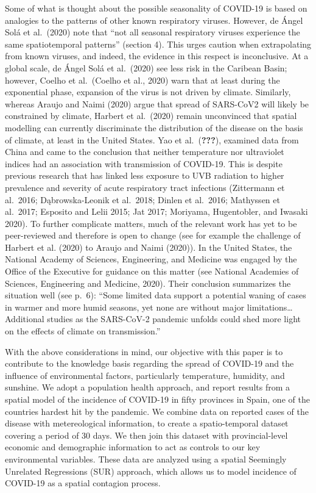 \documentclass[]{elsarticle} %
\begin{document}
Some of what is thought about the possible seasonality of COVID-19 is
based on analogies to the patterns of other known respiratory viruses.
However, de Ángel Solá et al.~(2020) note that ``not all seasonal
respiratory viruses experience the same spatiotemporal patterns''
(section 4). This urges caution when extrapolating from known viruses,
and indeed, the evidence in this respect is inconclusive. At a global
scale, de Ángel Solá et al.~(2020) see less risk in the Caribean Basin;
however, Coelho et al.~(Coelho et al., 2020) warn that at least during
the exponential phase, expansion of the virus is not driven by climate.
Similarly, whereas Araujo and Naimi (2020) argue that spread of
SARS-CoV2 will likely be constrained by climate, Harbert et al.~(2020)
remain unconvinced that spatial modelling can currently discriminate the
distribution of the disease on the basis of climate, at least in the
United States. Yao et al.~({\textbf{???}}), examined data from China and
came to the conclusion that neither temperature nor ultraviolet indices
had an association with transmission of COVID-19. This is despite
previous research that has linked less exposure to UVB radiation to
higher prevalence and severity of acute respiratory tract infections
(Zittermann et al.~2016; Dąbrowska-Leonik et al.~2018; Dinlen et
al.~2016; Mathyssen et al.~2017; Esposito and Lelii 2015; Jat 2017;
Moriyama, Hugentobler, and Iwasaki 2020). To further complicate matters,
much of the relevant work has yet to be peer-reviewed and therefore is
open to change (see for example the challenge of Harbert et al. (2020)
to Araujo and Naimi (2020)). In the United States, the National Academy
of Sciences, Engineering, and Medicine was engaged by the Office of the
Executive for guidance on this matter (see National Academies of
Sciences, Engineering and Medicine, 2020). Their conclusion summarizes
the situation well (see p.~6): ``Some limited data support a potential
waning of cases in warmer and more humid seasons, yet none are without
major limitations\ldots{}Additional studies as the SARS-CoV-2 pandemic
unfolds could shed more light on the effects of climate on
transmission.''

With the above considerations in mind, our objective with this paper is
to contribute to the knowledge basis regarding the spread of COVID-19
and the influence of environmental factors, particularly temperature,
humidity, and sunshine. We adopt a population health approach, and
report results from a spatial model of the incidence of COVID-19 in
fifty provinces in Spain, one of the countries hardest hit by the
pandemic. We combine data on reported cases of the disease with
metereological information, to create a spatio-temporal dataset covering
a period of 30 days. We then join this dataset with provincial-level
economic and demographic information to act as controls to our key
environmental variables. These data are analyzed using a spatial
Seemingly Unrelated Regressions (SUR) approach, which allows us to model
incidence of COVID-19 as a spatial contagion process.
\end{document}
